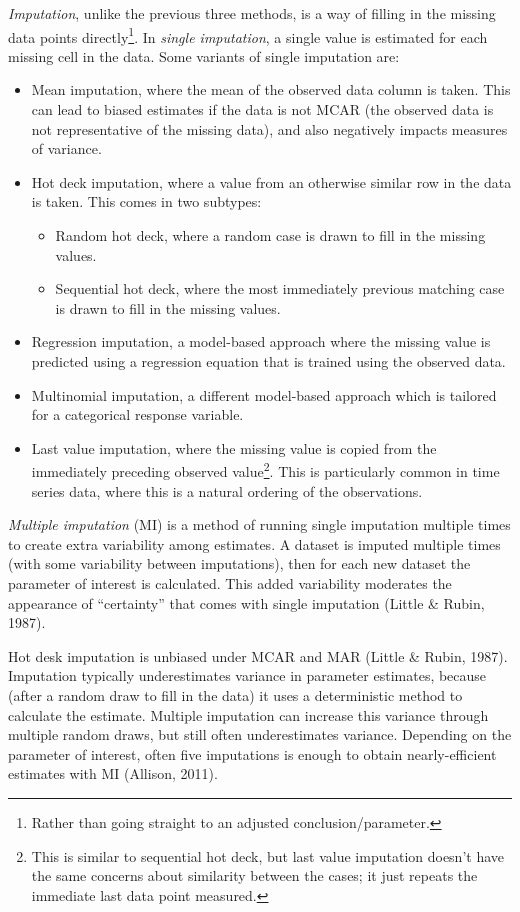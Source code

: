 \documentclass[12pt,twoside]{reedthesis}
\providecommand{\tightlist}{%
  \setlength{\itemsep}{0pt}\setlength{\parskip}{0pt}}
\begin{document}
\emph{Imputation}, unlike the previous three methods, is a way of filling in the missing data points directly\footnote{Rather than going straight to an adjusted conclusion/parameter.}. In \emph{single imputation}, a single value is estimated for each missing cell in the data. Some variants of single imputation are:
\begin{itemize}
\item
  Mean imputation, where the mean of the observed data column is taken. This can lead to biased estimates if the data is not MCAR (the observed data is not representative of the missing data), and also negatively impacts measures of variance.
\item
  Hot deck imputation, where a value from an otherwise similar row in the data is taken. This comes in two subtypes:
  \begin{itemize}
  \tightlist
  \item
    Random hot deck, where a random case is drawn to fill in the missing values.
  \item
    Sequential hot deck, where the most immediately previous matching case is drawn to fill in the missing values.
  \end{itemize}
\item
  Regression imputation, a model-based approach where the missing value is predicted using a regression equation that is trained using the observed data.
\item
  Multinomial imputation, a different model-based approach which is tailored for a categorical response variable.
\item
  Last value imputation, where the missing value is copied from the immediately preceding observed value\footnote{This is similar to sequential hot deck, but last value imputation doesn't have the same concerns about similarity between the cases; it just repeats the immediate last data point measured.}. This is particularly common in time series data, where this is a natural ordering of the observations.
\end{itemize}
\emph{Multiple imputation} (MI) is a method of running single imputation multiple times to create extra variability among estimates. A dataset is imputed multiple times (with some variability between imputations), then for each new dataset the parameter of interest is calculated. This added variability moderates the appearance of ``certainty'' that comes with single imputation (Little \& Rubin, 1987).

Hot desk imputation is unbiased under MCAR and MAR (Little \& Rubin, 1987). Imputation typically underestimates variance in parameter estimates, because (after a random draw to fill in the data) it uses a deterministic method to calculate the estimate. Multiple imputation can increase this variance through multiple random draws, but still often underestimates variance. Depending on the parameter of interest, often five imputations is enough to obtain nearly-efficient estimates with MI (Allison, 2011).
\end{document}
